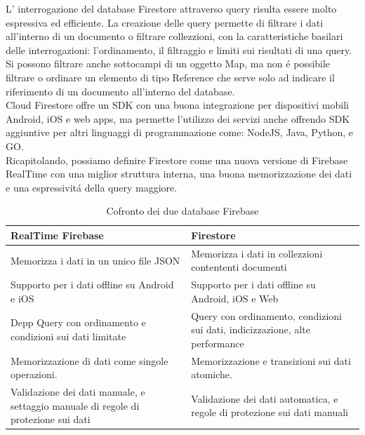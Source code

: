 L' interrogazione del database Firestore attraverso query risulta essere molto espressiva ed efficiente. La creazione delle query permette di filtrare i dati all'interno di un documento o filtrare collezzioni, con la caratteristiche basilari delle interrogazioni: l'ordinamento, il filtraggio e limiti sui risultati di una query. Si possono filtrare anche sottocampi di un oggetto Map, ma non \'e possibile filtrare o ordinare un elemento di tipo Reference che serve solo ad indicare il riferimento di un documento all'interno del database.\\
Cloud Firestore offre un SDK con una buona integrazione per dispositivi mobili Android, iOS e web apps, ma permette l'utilizzo dei servizi anche offrendo SDK aggiuntive per altri linguaggi di programmazione come: NodeJS, Java, Python, e GO.\\


Ricapitolando, possiamo definire Firestore come una nuova versione di Firebase RealTime con una miglior struttura interna, una buona memorizzazione dei dati e una espressivit\'a della query maggiore.

\begin{table}[h]
\begin{center}

\begin{tabular}{|p{7cm}|p{7cm}|}
    \hline
    \textbf{RealTime Firebase} & \textbf{Firestore} \\ \hline
    Memorizza i dati in un unico file JSON & Memorizza i dati in collezzioni contententi documenti \\ \hline
    Supporto per i dati offline su Android e iOS & Supporto per i dati offline su Android, iOS e Web \\ \hline
    Depp Query con ordinamento e condizioni sui dati limitate & Query con ordinamento, condizioni sui dati, indicizzazione, alte performance \\ \hline
    Memorizzazione di dati come singole operazioni. & Memorizzazione e transizioni sui dati atomiche.\\ \hline
    Validazione dei dati manuale, e settaggio manuale di regole di protezione sui dati &  Validazione dei dati automatica, e regole di protezione sui dati manuali\\
\hline
\end{tabular}
\caption[Firebase vs Firestore ]{Cofronto dei due database Firebase}\label{tab:FirestorevSFirebase}
\end{center}
\end{table}



